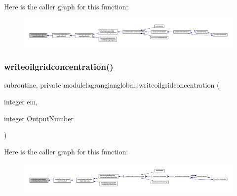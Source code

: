Here is the caller graph for this function\+:\nopagebreak
\begin{figure}[H]
\begin{center}
\leavevmode
\includegraphics[width=350pt]{namespacemodulelagrangianglobal_ab46abe813f09e4d8299d7750b21814d7_icgraph}
\end{center}
\end{figure}
\mbox{\label{namespacemodulelagrangianglobal_a82208b2a591060e1fa3a3e0726bfe869}} 
\subsubsection{\texorpdfstring{writeoilgridconcentration()}{writeoilgridconcentration()}}
{\footnotesize\ttfamily subroutine, private modulelagrangianglobal\+::writeoilgridconcentration (\begin{DoxyParamCaption}\item[{integer}]{em,  }\item[{integer}]{Output\+Number }\end{DoxyParamCaption})\hspace{0.3cm}{\ttfamily [private]}}

Here is the caller graph for this function\+:\nopagebreak
\begin{figure}[H]
\begin{center}
\leavevmode
\includegraphics[width=350pt]{namespacemodulelagrangianglobal_a82208b2a591060e1fa3a3e0726bfe869_icgraph}
\end{center}
\end{figure}
\mbox{\label{namespacemodulelagrangianglobal_ab2996daa63e4058df80e1dc7894c41af}} 
